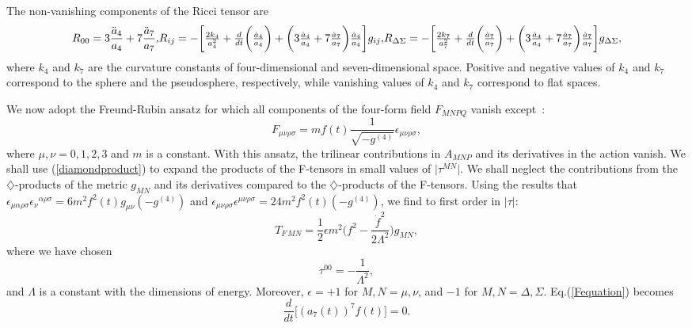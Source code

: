 \documentclass[a4paper,12pt]{article}
\begin{document}
The non-vanishing components of
the Ricci tensor are
\begin{equation}
\label{Ricci}
R_{00}=3\frac{{\ddot a_4}}{a_4}+7\frac{{\ddot a_7}}{a_7},
$$ $$
R_{ij}=-\biggl[\frac{2k_4}{a_4^2}
+\frac{d}{dt}\biggl(\frac{{\dot a}_4}{a_4}\biggr)+\biggl(3\frac{{\dot
a}_4}{a_4}+7\frac{{\dot a}_7}{a_7}\biggr)\frac{{\dot
a}_4}{a_4}\biggr]g_{ij},
$$ $$
R_{\Delta\Sigma}=-\biggl[\frac{2k_7}{a^2_7}+\frac{d}{dt}\biggl(\frac{{\dot
a}_7}{a_7}\biggr)+\biggl(3\frac{{\dot a}_4}{a_4}+7\frac{{\dot
a}_7}{a_7}\biggr)\frac{{\dot a}_7}{a_7}\biggr]g_{\Delta\Sigma},
\end{equation}
where $k_4$ and $k_7$ are the curvature constants of
four-dimensional and seven-dimensional space. Positive and negative values
of $k_4$ and $k_7$ correspond to the sphere and the pseudosphere,
respectively, while vanishing values of $k_4$ and $k_7$ correspond to flat
spaces.

We now adopt the Freund-Rubin ansatz for which all components of the
four-form field $F_{MNPQ}$ vanish except~\cite{Freund,Freund2}:
\begin{equation}
F_{\mu\nu\rho\sigma}=mf(t)\frac{1}{\sqrt{-g^{(4)}}}\epsilon_{\mu\nu\rho\sigma},
\end{equation}
where $\mu,\nu=0,1,2,3$ and $m$ is a constant. With this ansatz, the
trilinear contributions in $A_{MNP}$ and its derivatives in the action
vanish. We shall use (\ref{diamondproduct}) to expand the products of the
F-tensors in small values of $\vert\tau^{MN}\vert$. We shall neglect the
contributions from the $\diamondsuit$-products of the metric $g_{MN}$ and
its derivatives compared to the $\diamondsuit$-products of the F-tensors.
Using the results that
$\epsilon_{\mu\alpha\rho\sigma}{\epsilon_\nu}^{\alpha\rho\sigma}
=6m^2f^2(t)g_{\mu\nu}(-g^{(4)})$ and
$\epsilon_{\mu\nu\rho\sigma}\epsilon^{\mu\nu\rho\sigma}=24m^2f^2(t)(-g^{(4)})$,
we find to first order in $\vert\tau\vert$:
\begin{equation}
T_{F\,MN}=\frac{1}{2}\epsilon
m^2\biggl(f^2-\frac{{\dot f}^2}{2\Lambda^2}\biggr)g_{MN},
\end{equation}
where we have chosen
\begin{equation}
\tau^{00}=-\frac{1}{\Lambda^2},
\end{equation}
and $\Lambda$ is a constant with the dimensions of energy.
Moreover, $\epsilon =+1$ for $M,N=\mu,\nu$, and $-1$ for
$M,N=\Delta,\Sigma$. Eq.(\ref{Fequation}) becomes
\begin{equation}
\frac{d}{dt}\biggl[(a_7(t))^7f(t)\biggr]=0.
\end{equation}
\end{document}
